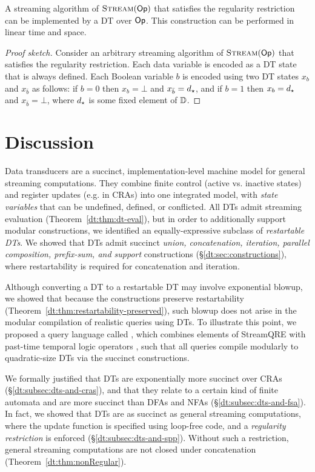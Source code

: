 \begin{theorem}
A streaming algorithm of $\textsc{Stream}(\textsf{Op})$ that satisfies the regularity restriction can be implemented by a DT over $\textsf{Op}$. This construction can be performed in linear time and space.
\end{theorem}
\begin{proof}[Proof sketch]
Consider an arbitrary streaming algorithm of $\textsc{Stream}(\textsf{Op})$ that satisfies the regularity restriction. Each data variable is encoded as a DT state that is always defined. Each Boolean variable $b$ is encoded using two DT states $x_b$ and $x_{\bar b}$ as follows: if $b = 0$ then $x_b = \bot$ and $x_{\bar b} = d_\star$, and if $b = 1$ then $x_b = d_\star$ and $x_{\bar b} = \bot$, where $d_\star$ is some fixed element of $\mathbb{D}$.
\end{proof}

\section{Discussion}

Data transducers are a succinct, implementation-level machine model for general streaming computations.
They combine finite control (active vs. inactive states) and
register updates (e.g. in CRAs) into one integrated model, with \emph{state variables} that can be
undefined, defined, or conflicted.
All DTs admit streaming evaluation (Theorem~\ref{dt:thm:dt-eval}), but in order to additionally support modular constructions, we identified an equally-expressive subclass of \emph{restartable DTs}.
We showed that DTs admit succinct \emph{union, concatenation, iteration, parallel composition, prefix-sum, and support} constructions (\S\ref{dt:sec:constructions}), where restartability is required for concatenation and iteration.

Although converting a DT to a restartable DT may involve exponential blowup, we showed that because the constructions preserve restartability (Theorem~\ref{dt:thm:restartability-preserved}), such blowup does not arise in the modular compilation of realistic queries using DTs. To illustrate this point, we proposed a query language called \QREpast{}, which combines elements of StreamQRE \cite{StreamQRE} with past-time temporal logic operators \cite{havelund2004efficient}, such that all queries compile modularly to quadratic-size DTs via the succinct constructions.

We formally justified that DTs are exponentially more succinct over CRAs (\S\ref{dt:subsec:dts-and-cras}), and that they relate to a certain kind of finite automata and are more succinct than DFAs and NFAs (\S\ref{dt:subsec:dts-and-fsa}). In fact, we showed that DTs are as succinct as general streaming computations, where the update function is specified using loop-free code, and a \emph{regularity restriction} is enforced (\S\ref{dt:subsec:dts-and-spp}). Without such a restriction, general streaming computations are not closed under concatenation (Theorem~\ref{dt:thm:nonRegular}).

